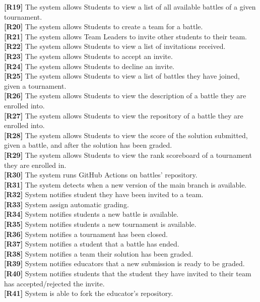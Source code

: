 \documentclass{article}
\begin{document}
\textbf{[R19]} The system allows Students to view a list of all available battles of a given tournament.\\
\textbf{[R20]} The system allows Students to create a team for a battle.\\
\textbf{[R21]} The system allows Team Leaders to invite other students to their team.\\
\textbf{[R22]} The system allows Students to view a list of invitations received.\\
\textbf{[R23]} The system allows Students to accept an invite.\\
\textbf{[R24]} The system allows Students to decline an invite.\\
\textbf{[R25]} The system allows Students to view a list of battles they have joined, given a tournament.\\
\textbf{[R26]} The system allows Students to view the description of a battle they are enrolled into.\\
\textbf{[R27]} The system allows Students to view the repository of a battle they are enrolled into.\\
\textbf{[R28]} The system allows Students to view the score of the solution submitted, given a battle, and after the solution has been graded.\\
\textbf{[R29]} The system allows Students to view the rank scoreboard of a tournament they are enrolled in.\\
\textbf{[R30]} The system runs GitHub Actions on battles’ repository.\\
\textbf{[R31]} The system detects when a new version of the main branch is available.\\
\textbf{[R32]} System notifies student they have been invited to a team.\\
\textbf{[R33]} System assign automatic grading.\\
\textbf{[R34]} System notifies students a new battle is available.\\
\textbf{[R35]} System notifies students a new tournament is available. \\
\textbf{[R36]} System notifies a tournament has been closed.\\
\textbf{[R37]} System notifies a student that a battle has ended.\\
\textbf{[R38]} System notifies a team their solution has been graded.\\
\textbf{[R39]} System notifies educators that a new submission is ready to be graded.\\
\textbf{[R40]} System notifies students that the student they have invited to their team has accepted/rejected the invite.\\
\textbf{[R41]} System is able to fork the educator’s repository.\\
\end{document}

